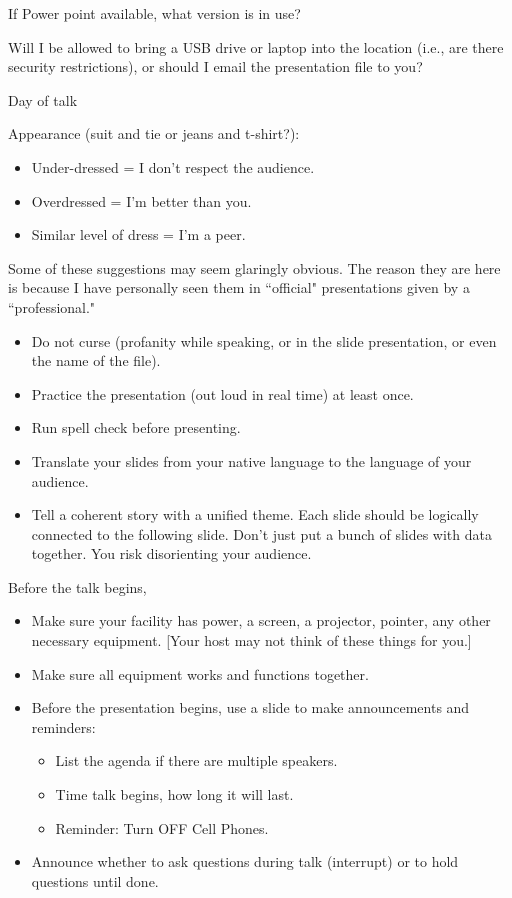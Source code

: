 If Power point available, what version is in use?

Will I be allowed to bring a USB drive or laptop into the location (i.e., are there security restrictions), or should I email the presentation file to you?

Day of talk

Appearance (suit and tie or jeans and t-shirt?):
\begin{itemize}
    \item Under-dressed = I don't respect the audience.
    \item Overdressed = I'm better than you.
    \item Similar level of dress = I'm a peer.
\end{itemize}
Some of these suggestions may seem glaringly obvious. The reason they are here is because I have personally seen them in ``official" presentations given by a ``professional."
\begin{itemize}
    \item Do not curse (profanity while speaking, or in the slide presentation, or even the name of the file).
    \item Practice the presentation (out loud in real time) at least once.
    \item Run spell check before presenting.
    \item Translate your slides from your native language to the language of your audience.
    \item Tell a coherent story with a unified theme. Each slide should be logically connected to the following slide. Don't just put a bunch of slides with data together. You risk disorienting your audience.
\end{itemize}
Before the talk begins,
\begin{itemize}
    \item Make sure your facility has power, a screen, a projector, pointer, any other necessary equipment. [Your host may not think of these things for you.]
    \item Make sure all equipment works and functions together.
    \item Before the presentation begins, use a slide to make announcements and reminders:
\begin{itemize}
    \item List the agenda if there are multiple speakers.
    \item Time talk begins, how long it will last.
    \item Reminder: Turn OFF Cell Phones.
\end{itemize}
    \item Announce whether to ask questions during talk (interrupt) or to hold questions until done.
\end{itemize}
